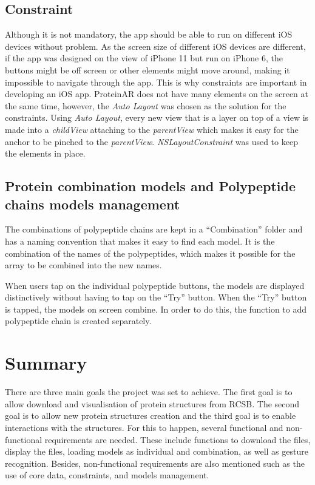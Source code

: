 \subsection{Constraint}
Although it is not mandatory, the app should be able to run on different iOS devices without problem. As the screen size of different iOS devices are different, if the app was designed on the view of iPhone 11 but run on iPhone 6, the buttons might be off screen or other elements might move around, making it impossible to navigate through the app. This is why constraints are important in developing an iOS app. ProteinAR does not have many elements on the screen at the same time, however, the \emph{Auto Layout} was chosen as the solution for the constraints. Using \emph{Auto Layout}, every new view that is a layer on top of a view is made into a \emph{childView} attaching to the \emph{parentView} which makes it easy for the anchor to be pinched to the \emph{parentView}. \emph{NSLayoutConstraint} was used to keep the elements in place. 

\subsection{Protein combination models and Polypeptide chains models management}
The combinations of polypeptide chains are kept in a “Combination” folder and has a naming convention that makes it easy to find each model. It is the combination of the names of the polypeptides, which makes it possible for the array to be combined into the new names. 

When users tap on the individual polypeptide buttons, the models are displayed distinctively without having to tap on the “Try” button. When the “Try” button is tapped, the models on screen combine. In order to do this, the function to add polypeptide chain is created separately. 

\section{Summary}
 There are three main goals the project was set to achieve. The first goal is to allow download and visualisation of protein structures from RCSB. The second goal is to allow new protein structures creation and the third goal is to enable interactions with the structures. For this to happen, several functional and non-functional requirements are needed. These include functions to download the files, display the files, loading models as individual and combination, as well as gesture recognition. Besides, non-functional requirements are also mentioned such as the use of core data, constraints, and models management. 
